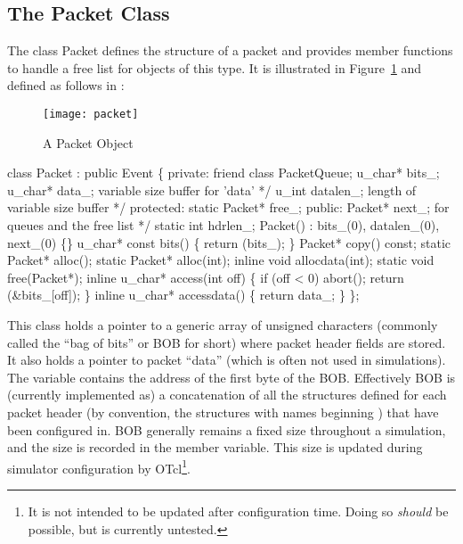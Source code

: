 \subsection{The Packet Class}
\label{sec:packetclass}

The class Packet defines the structure of a
packet and provides member functions to handle a
free list for objects of this type.
It is illustrated in Figure~\ref{pic:packet} and
defined as follows in :
\begin{figure}[h]
  \centerline{\texttt{[image: packet]}}
  \caption{A Packet Object}
  \label{pic:packet}
\end{figure}
\begin{program}
        class Packet : public Event \{
        private:
                friend class PacketQueue;
                u_char* bits_;  
                u_char* data_;  \* variable size buffer for 'data' */
                u_int datalen_; \* length of variable size buffer */
        protected:
                static Packet* free_;
        public: 
                Packet* next_;  \* for queues and the free list */
                static int hdrlen_;
                Packet() : bits_(0), datalen_(0), next_(0) \{\}
                u_char* const bits() \{ return (bits_); \}
                Packet* copy() const;
                static Packet* alloc();
                static Packet* alloc(int);
                inline void allocdata(int);
                static void free(Packet*);
                inline u_char* access(int off) \{
                        if (off < 0)
                                abort();
                        return (&bits_[off]);
                \}  
                inline u_char* accessdata() \{ return data_; \}
        \};
\end{program}
This class holds a pointer to a generic array of unsigned
characters (commonly called the ``bag of bits'' or BOB for short)
where packet header fields are stored.
It also holds a pointer to packet ``data'' (which is often not used in
simulations).
The  variable contains the address of
the first byte of the BOB.
Effectively BOB is (currently implemented as) a concatenation
of all the structures defined for each packet header (by convention,
the structures with names beginning ) that have
been configured in.
BOB generally remains a fixed size throughout a simulation, and
the size is recorded in the  member
variable.
This size is updated during simulator configuration by
OTcl\footnote{It is not intended to be updated after configuration
time.  Doing so {\em should} be possible, but is currently untested.}.

